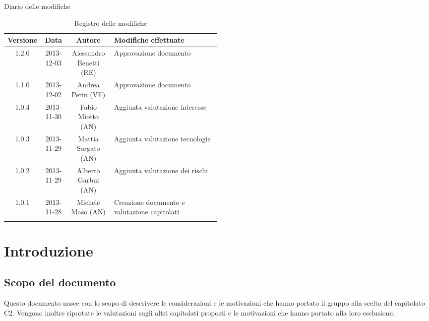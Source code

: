 
\newpage
Diario delle modifiche
\begin{center}
\begin{longtable}{|c|c|c|p{0.5\linewidth}|}
\toprule
\textbf{Versione} & \textbf{Data} & \textbf{Autore} & \textbf{Modifiche effettuate}\\

\midrule
1.2.0 & 2013-12-03 & Alessandro Benetti (RE) & Approvazione documento\\
\midrule
1.1.0 & 2013-12-02 & Andrea Perin (VE) & Approvazione documento\\
\midrule
1.0.4 & 2013-11-30 & Fabio Miotto (AN) & Aggiunta valutazione interesse\\
\midrule
1.0.3 & 2013-11-29 & Mattia Sorgato (AN) & Aggiunta valutazione tecnologie\\
\midrule
1.0.2 & 2013-11-29 & Alberto Garbui (AN) & Aggiunta valutazione dei rischi\\
\midrule
1.0.1 & 2013-11-28 & Michele Maso (AN) & Creazione documento e valutazione capitolati\\

\bottomrule
\caption{Registro delle modifiche}
\label{tab:changelog}
\end{longtable}
\end{center}

\newpage
\tableofcontents

\newpage
\listoftables
\listoffigures

\newpage
\section{Introduzione}%
\label{1.0}
\subsection{Scopo del documento}%
\label{1.1}
Questo documento nasce con lo scopo di descrivere le considerazioni e le motivazioni che hanno portato il gruppo alla scelta del capitolato C2. Vengono inoltre riportate le valutazioni sugli altri capitolati proposti e le motivazioni che hanno portato alla loro esclusione.

